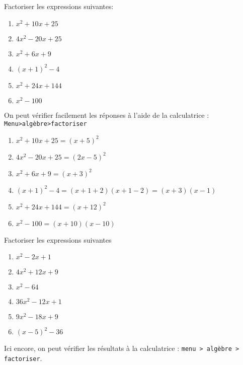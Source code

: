 






\begin{exo}[type=solution] Factoriser les expressions suivantes: 
\label{fact1}

\begin{multicols}{2}
\begin{enumerate}[label=\bf{\alph*)\,}]		
\item  $x^2+10x+25$
\item  $4x^2-20x+25$
\item  $x^2+6x+9$
\item $(x+1)^2-4$
\item  $x^2+24x+144$
\item $x^2-100$
\end{enumerate}
\end{multicols}

\begin{sol}
On peut vérifier facilement les réponses à l'aide de la calculatrice : \texttt{Menu>algèbre>factoriser}
\begin{enumerate}[label=\bf{\alph*)\,}]		
\item  $x^2+10x+25=(x+5)^2$
\item  $4x^2-20x+25 = (2x-5)^2$
\item  $x^2+6x+9 = (x+3)^2$
\item $(x+1)^2-4 =(x+1+2)(x+1-2)=(x+3)(x-1)$
\item  $x^2+24x+144 = (x+12)^2$
\item $x^2-100=(x+10)(x-10)$
\end{enumerate}
\end{sol}
\end{exo}	





\begin{exo}
Factoriser les expressions suivantes \label{fact2}

\begin{multicols}{2}
	\begin{enumerate}[label=\bf{\alph*)\,}]	
\item  $x^2-2x+1$
\item  $4x^2+12x+9$
\item $x^2-64$
\item $36x^2-12x+1$
\item  $9x^2-18x+9$
\item $(x-5)^2-36$
\end{enumerate}
\end{multicols}

\begin{sol*}
Ici encore, on peut vérifier les résultats à la calculatrice : \texttt{menu > algèbre > factoriser}.
\end{sol*}

\end{exo}	